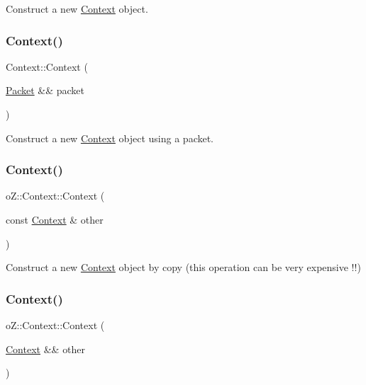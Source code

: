 Construct a new \mbox{\hyperlink{classo_z_1_1_context}{Context}} object. 

\mbox{\label{classo_z_1_1_context_aa57df3d21eacc6e149f9c61c0c3f196b}} 
\subsubsection{\texorpdfstring{Context()}{Context()}\hspace{0.1cm}{\footnotesize\ttfamily [2/4]}}
{\footnotesize\ttfamily Context\+::\+Context (\begin{DoxyParamCaption}\item[{\mbox{\hyperlink{classo_z_1_1_packet}{Packet}} \&\&}]{packet }\end{DoxyParamCaption})}



Construct a new \mbox{\hyperlink{classo_z_1_1_context}{Context}} object using a packet. 

\mbox{\label{classo_z_1_1_context_a906eb29f22e89bc121c47096c7a4b601}} 
\subsubsection{\texorpdfstring{Context()}{Context()}\hspace{0.1cm}{\footnotesize\ttfamily [3/4]}}
{\footnotesize\ttfamily o\+Z\+::\+Context\+::\+Context (\begin{DoxyParamCaption}\item[{const \mbox{\hyperlink{classo_z_1_1_context}{Context}} \&}]{other }\end{DoxyParamCaption})\hspace{0.3cm}{\ttfamily [default]}}



Construct a new \mbox{\hyperlink{classo_z_1_1_context}{Context}} object by copy (this operation can be very expensive !!) 

\mbox{\label{classo_z_1_1_context_ad4a49704266f6e8312b1c9c2ca8ad710}} 
\subsubsection{\texorpdfstring{Context()}{Context()}\hspace{0.1cm}{\footnotesize\ttfamily [4/4]}}
{\footnotesize\ttfamily o\+Z\+::\+Context\+::\+Context (\begin{DoxyParamCaption}\item[{\mbox{\hyperlink{classo_z_1_1_context}{Context}} \&\&}]{other }\end{DoxyParamCaption})\hspace{0.3cm}{\ttfamily [default]}}



